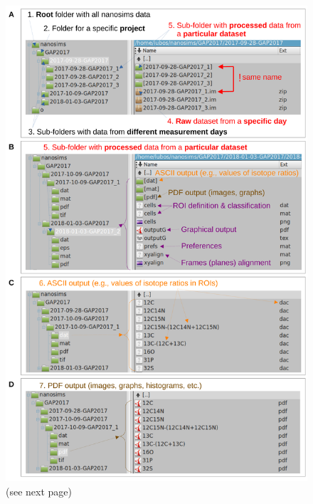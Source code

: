 \documentclass[a4paper, 11pt]{article}
\begin{document}
\begin{figure}[b!]
\centering
\includegraphics[height=0.97\textheight]{figs2/folders_organization}
\caption[]{(see next page)}
\end{figure}
\end{document}
